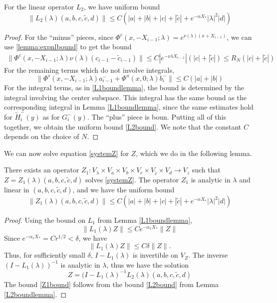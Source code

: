 \documentclass[thesis.tex]{subfiles}
\begin{document}
\begin{lemma}\label{L2boundlemma}
For the linear operator $L_2$, we have uniform bound
\begin{equation}\label{L2bound}
\| L_2(\lambda) (a,b,c,\tilde{c},d) \| \leq C\left(|a| + |b| + |c| + |\tilde{c}| + e^{-\alpha X_*}|\lambda|^2|d|\right)
\end{equation}
\begin{proof}
For the ``minus'' pieces, since $\Phi^c(x, -X_{i-1}; \lambda) = e^{\nu(\lambda)(x + X_{i-1})}$, we can use \cref{lemma:expnlbound} to get the bound
\begin{align*}
\| \Phi^c(x, -X_{i-1}; \lambda) \nu(\lambda)(c_{i-1} - \tilde{c}_{i-1}) \| \leq C |e^{-\nu{\lambda}X_{i-1}}|(|c| + |\tilde{c}|) \leq R_N (|c| + |\tilde{c}|)
\end{align*}
For the remaining terms which do not involve integrals,
\[
\| \Phi^s(x, -X_{i-1}; \lambda) a_{i-1}^- + \Phi^u(x, 0; \lambda) b_i^- \| \leq C(|a| + |b|)
\]
For the integral terms, as in \cref{L1boundlemma}, the bound is determined by the integral involving the center subspace. This integral has the same bound as the corresponding integral in Lemma \ref{L1boundlemma}, since the same estimates hold for $\tilde{H}_i^-(y)$ as for $G_i^-(y)$. The ``plus'' piece is boun. Putting all of this together, we obtain the uniform bound \cref{L2bound}. We note that the constant $C$ depends on the choice of $N$.
\end{proof}
\end{lemma}

We can now solve equation \eqref{systemZ} for $Z$, which we do in the following lemma.

\begin{lemma}\label{Zinv0}
There exists an operator $Z_1: V_\lambda \times V_a \times V_b \times V_c \times V_{\tilde{c}} \times V_d \rightarrow V_z$ such that $Z = Z_1(\lambda)(a,b,c,\tilde{c},d)$ solves \eqref{systemZ}. The operator $Z_1$ is analytic in $\lambda$ and linear in $(a,b,c,\tilde{c},d)$, and we have the uniform bound
\begin{equation}\label{Z1bound}
\| Z_1(\lambda)(a,b,c,\tilde{c},d) \| \leq C\left(|a| + |b| + |c| + |\tilde{c}| + e^{-\alpha X_*}|\lambda|^2|d|\right)
\end{equation}
\begin{proof}
Using the bound on $L_1$ from Lemma \ref{L1boundlemma}, 
\[
\|L_1(\lambda)Z\| \leq C e^{-\alpha_1 X_*}\|Z\|
\]
Since $e^{-\alpha_1 X_*} = C r^{1/2} < \delta$, we have
\[
\|L_1(\lambda)Z\| \leq C \delta \|Z\|.
\]
Thus, for sufficiently small $\delta$, $I - L_1(\lambda)$ is invertible on $V_Z$. The inverse $(I - L_1(\lambda))^{-1}$ is analytic in $\lambda$, thus we have the solution
\begin{equation}\label{L1L2eq}
Z = (I - L_1(\lambda)^{-1}L_2(\lambda)(a,b,c,\tilde{c},d)
\end{equation}
The bound \eqref{Z1bound} follows from the bound \eqref{L2bound} from Lemma \ref{L2boundlemma}.
\end{proof}
\end{lemma}
\end{document}
